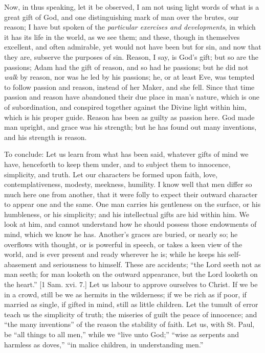 Now, in thus speaking, let it be observed, I am not using light
words of what is a great gift of God, and one distinguishing mark of
man over the brutes, our reason; I have but spoken of the \emph{particular
exercises and developments}, in which it has its life in the world,
as we see them; and these, though in themselves excellent, and often
admirable, yet would not have been but for sin, and now that they are,
subserve the purposes of sin. Reason, I say, is God's gift; but so are
the passions; Adam had the gift of reason, and so had he passions; but
he did not \emph{walk} by reason, nor was he led by his passions; he,
or at least Eve, was tempted to follow passion and reason, instead of
her Maker, and she fell. Since that time passion and reason have
abandoned their due place in man's nature, which is one of
subordination, and conspired together against the Divine light within
him, which is his proper guide. Reason has been as guilty as passion
here. God made man upright, and grace was his strength; but he has
found out many inventions, and his strength is reason.

To conclude: Let us learn from what has been said, whatever gifts
of mind we have, henceforth to keep them under, and to subject them to
innocence, simplicity, and truth. Let our characters be formed upon
faith, love, contemplativeness, modesty, meekness, humility. I know
well that men differ so much here one from another, that it were folly
to expect their outward character to appear one and the same. One man
carries his gentleness on the surface, or his humbleness, or his
simplicity; and his intellectual gifts are hid within him. We look at
him, and cannot understand how he should possess those endowments of
mind, which we know he has. Another's graces are buried, or nearly so;
he overflows with thought, or is powerful in speech, or takes a keen
view of the world, and is ever present and ready wherever he is; while
he keeps his self-abasement and seriousness to himself. These are
accidents; ``the Lord seeth not as man seeth; for man looketh on
the outward appearance, but the Lord looketh on the heart.'' [1
Sam. xvi. 7.] Let us labour to approve ourselves to Christ. If we be
in a crowd, still be we as hermits in the wilderness; if we be rich as
if poor, if married as single, if gifted in mind, still as little
children. Let the tumult of error teach us the simplicity of truth;
the miseries of guilt the peace of innocence; and ``the many
inventions'' of the reason the stability of faith. Let us, with
St. Paul, be ``all things to all men,'' while we ``live
unto God;'' ``wise as serpents and harmless as doves,''
``in malice children, in understanding men.''

